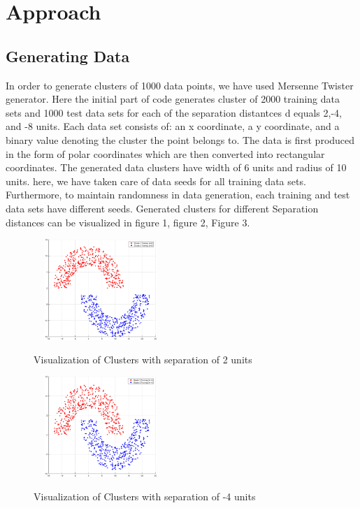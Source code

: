 \documentclass[conference]{IEEEtran}
\begin{document}
\section{Approach}

\subsection{Generating Data}
In order to generate clusters of 1000 data points, we have used Mersenne Twister \cite{twister} generator. Here the initial part of code generates cluster of 2000 training data sets and 1000 test data sets for each of the separation distantces d equals 2,-4, and -8 units. Each data set consists of: an x coordinate, a y coordinate, and a binary value denoting the cluster the point belongs to. The data is first produced in the form of polar coordinates which are then converted into rectangular coordinates. The generated data clusters have width of 6 units and radius of 10 units. here, we have taken care of data seeds for all training data sets. Furthermore, to maintain randomness in data generation, each training and test data sets have different seeds\cite{rng}. Generated clusters for different Separation distances can be visualized in figure 1, figure 2, Figure 3. 
\begin{figure}[h!]
\centering
{\includegraphics[width=2in,height=1.5in,clip,keepaspectratio]{ClustersD2.eps} }\\
\caption{ Visualization of Clusters with separation of 2 units}
\end{figure}

\begin{figure}[h!]
\centering
{\includegraphics[width=2in,height=1.5in,clip,keepaspectratio]{ClustersDn4.eps} }\\
\caption{ Visualization of Clusters with separation of -4 units}
\end{figure}
\end{document}
